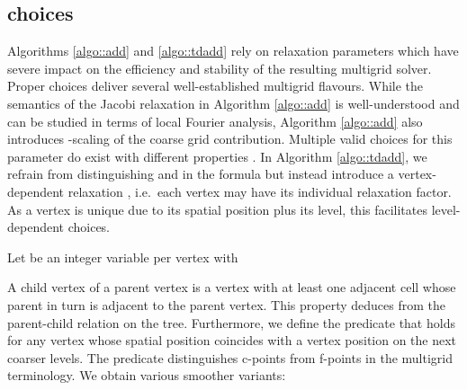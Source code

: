 \subsection{ choices}


Algorithms \ref{algo::add} and \ref{algo::tdadd} rely on relaxation
parameters which have severe impact on the efficiency and stability of the
resulting multigrid solver.
Proper choices deliver several well-established multigrid flavours. 
While the semantics of the Jacobi relaxation  in Algorithm 
\ref{algo::add} is well-understood and can be studied in terms of local Fourier
analysis, Algorithm \ref{algo::add} also introduces -scaling of the
coarse grid contribution.
Multiple valid choices for this parameter do exist with
different properties \cite{Bastian:98:AdditiveVsMultiplicativeMG}.
In Algorithm \ref{algo::tdadd}, we refrain from distinguishing  and
 in the formula but instead introduce a vertex-dependent
relaxation , i.e.~each vertex may have its individual relaxation
factor.
As a vertex is unique due to its spatial position plus its level, this 
facilitates level-dependent  choices.


Let  be an integer
variable per vertex  with

A child vertex of a parent vertex is a vertex with at least one adjacent cell
whose parent in turn is adjacent to the parent vertex.
This property deduces from the parent-child relation on the tree.
Furthermore, we define the predicate  that holds for any
vertex whose spatial position coincides with a vertex position on the next coarser levels.
The predicate distinguishes c-points from f-points in the multigrid terminology.
We obtain various smoother variants:

